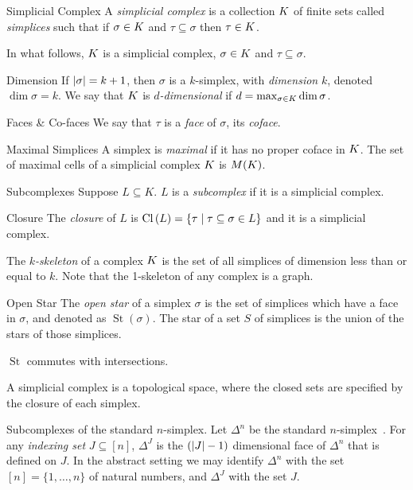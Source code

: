 \begin{definition}{Simplicial Complex}
A \emph{simplicial complex} is a collection $K$ of finite sets called
\emph{simplices} such that if $\sigma \in K$ and $\tau \subseteq \sigma$ then $\tau \in K$. 
\end{definition}
In what follows, $K$ is a simplicial complex, $\sigma \in K$ and $\tau \subseteq \sigma$.
\begin{definition}{Dimension}
If $|\sigma| = k+1$, then $\sigma$ is a $k$-simplex, with \emph{dimension} $k$, denoted 
$\dim{\sigma} = k$. We say that $K$ is \emph{$d$-dimensional} if 
$d = \max_{\sigma \in K} \dim{\sigma}$.
\end{definition}
\begin{definition}{Faces \& Co-faces}
We say that $\tau$ is a \emph{face} of $\sigma$, its \emph{coface}. 
\end{definition}
\begin{definition}{Maximal Simplices}
A simplex is \emph{maximal} if it has no proper coface in $K$. The set of maximal cells of a simplicial complex $K$ is $M(K)$. 
\end{definition}
\begin{definition}{Subcomplexes}
Suppose $L \subseteq K$.  $L$ is a \emph{subcomplex} if it is a simplicial complex.
\end{definition}
\begin{definition}{Closure}
 The \emph{closure} of $L$ is $\operatorname{Cl}{(}L) = \{ \tau \mid \tau \subseteq \sigma \in L\}$ and it is a simplicial complex.
\end{definition}
\begin{definition}
The  \emph{$k$-skeleton} of a complex $K$ is the set of all simplices
of dimension less than or equal to $k$. Note that the 1-skeleton of
any complex is a graph.
\end{definition}
\begin{definition}{Open Star}
The \emph{open star} of a simplex $\sigma$ is the set of simplices which have a face in $\sigma$, and denoted as $\operatorname{St}(\sigma)$. The star of a set $S$ of simplices is the union of the stars of those simplices.
\end{definition}
\begin{lemma}
$\operatorname{St}$ commutes with intersections.
\label{lem:st-inter}
\end{lemma}
A simplicial complex is a topological space, where the closed sets are specified by the closure of each simplex.
\begin{definition}{Subcomplexes of the standard $n$-simplex.}
Let $\Delta^n$ be the standard $n$-simplex~\cite{hatcher}. For any
\emph{indexing set} $J \subseteq [n]$, $\Delta^J$ is the $(|J|-1)$ 
dimensional face of $\Delta^n$  that is defined on $J$. In the abstract setting we may
identify $\Delta^n$ with the set $[n] = \{1, \ldots, n\}$ of natural numbers, and $\Delta^J$ with the set $J$.
\end{definition}
